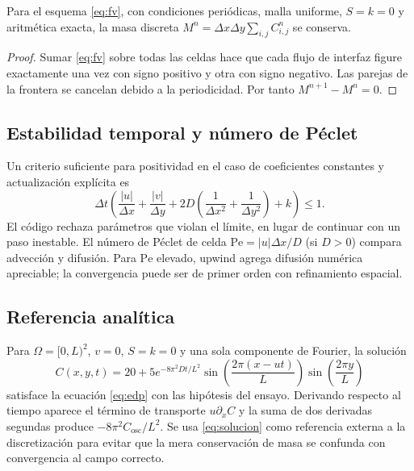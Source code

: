 \begin{proposicion}\label{prop:masa}
Para el esquema \eqref{eq:fv}, con condiciones periódicas, malla uniforme, $S=k=0$ y aritmética exacta, la masa discreta $M^n=\Delta x\Delta y\sum_{i,j} C_{i,j}^n$ se conserva.
\end{proposicion}
\begin{proof}Sumar \eqref{eq:fv} sobre todas las celdas hace que cada flujo de interfaz figure exactamente una vez con signo positivo y otra con signo negativo. Las parejas de la frontera se cancelan debido a la periodicidad. Por tanto $M^{n+1}-M^n=0$.\end{proof}

\subsection{Estabilidad temporal y número de Péclet}
Un criterio suficiente para positividad en el caso de coeficientes constantes y actualización explícita es
\begin{equation}\Delta t\left(\frac{|u|}{\Delta x}+\frac{|v|}{\Delta y}+2D\left(\frac1{\Delta x^2}+\frac1{\Delta y^2}\right)+k\right)\leq1.\label{eq:cfl}\end{equation}
El código rechaza parámetros que violan el límite, en lugar de continuar con un paso inestable. El número de Péclet de celda $\mathrm{Pe}=|u|\Delta x/D$ (si $D>0$) compara advección y difusión. Para $\mathrm{Pe}$ elevado, upwind agrega difusión numérica apreciable; la convergencia puede ser de primer orden con refinamiento espacial.

\subsection{Referencia analítica}
Para $\Omega=[0,L)^2$, $v=0$, $S=k=0$ y una sola componente de Fourier, la solución
\begin{equation}C(x,y,t)=20+5e^{-8\pi^2Dt/L^2}\sin\left(\frac{2\pi(x-ut)}L\right)\sin\left(\frac{2\pi y}L\right)\label{eq:solucion}\end{equation}
satisface la ecuación \eqref{eq:edp} con las hipótesis del ensayo. Derivando respecto al tiempo aparece el término de transporte $u\partial_xC$ y la suma de dos derivadas segundas produce $-8\pi^2 C_{\mathrm{osc}}/L^2$. Se usa \eqref{eq:solucion} como referencia externa a la discretización para evitar que la mera conservación de masa se confunda con convergencia al campo correcto.

